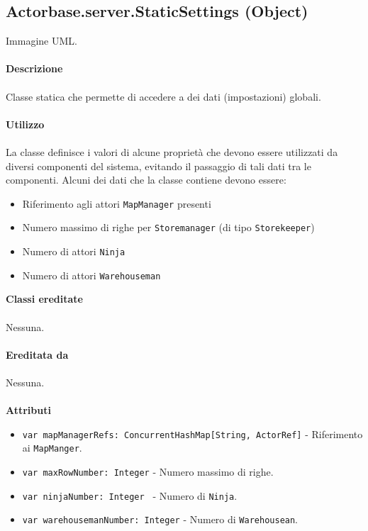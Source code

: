 \documentclass[a4paper]{article}
\begin{document}
		\subsection{Actorbase.server.StaticSettings (Object)}
		Immagine UML.
		\\ \\
		\textbf{Descrizione}
			\\ \\
			Classe statica che permette di accedere a dei dati (impostazioni) globali.
			\\ \\
		\textbf{Utilizzo}
			\\ \\
			La classe definisce i valori di alcune proprietà che devono essere utilizzati da diversi componenti del sistema, evitando il passaggio di tali dati tra le componenti. Alcuni dei dati che la classe contiene devono essere:
			\begin{itemize}
				\item Riferimento agli attori \texttt{MapManager} presenti
				\item Numero massimo di righe per \texttt{Storemanager} (di tipo \texttt{Storekeeper})
				\item Numero di attori \texttt{Ninja}
				\item Numero di attori \texttt{Warehouseman}
			\end{itemize}
		\textbf{Classi ereditate}
			\\ \\
			Nessuna.
			\\ \\
		\textbf{Ereditata da}
			\\ \\
			Nessuna.
			\\ \\
		\textbf{Attributi}
			\begin{itemize}
				\item \texttt{var mapManagerRefs: ConcurrentHashMap[String, ActorRef]} - Riferimento ai \texttt{MapManger}.
				\item \texttt{var maxRowNumber: Integer} - Numero massimo di righe.
				\item \texttt{var ninjaNumber: Integer } - Numero di \texttt{Ninja}.
				\item \texttt{var warehousemanNumber: Integer} - Numero di \texttt{Warehousean}.
			\end{itemize}
			
\end{document}
